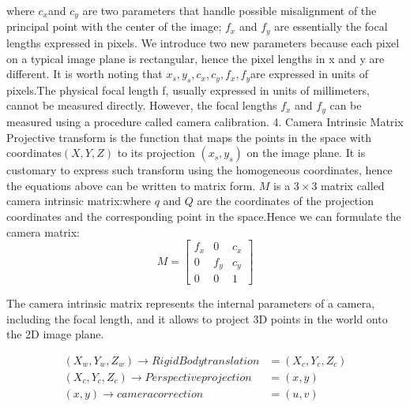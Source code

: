 \documentclass{article}
\begin{document}
where $c_x$and $c_y$
are two parameters that handle possible misalignment of the principal point with the center of the image; $f_x$ and $f_y$
are essentially the focal lengths expressed in pixels. We introduce two new parameters because each pixel on a typical image plane is rectangular, hence the pixel lengths in x and y are different. It is worth noting that $x_s,y_s,c_x,c_y,f_x,f_y$are expressed in units of pixels.The physical focal length f, usually expressed in units of millimeters, cannot be measured directly. However, the focal lengths $f_x$ and $f_y$ can be measured using a procedure called camera calibration.
4. Camera Intrinsic Matrix
Projective transform is the function that maps the points in the space with coordinates$(X, Y, Z)$ to its projection $(x_s, y_s)$ on the image plane. It is customary to express such transform using the homogeneous coordinates, hence the equations above can be written to matrix form.
$M$ is a $3\times3$ matrix called camera intrinsic matrix:where $q$ and $Q$ are the coordinates of the projection coordinates  and the corresponding point in the space.Hence we can formulate the camera matrix:
\begin{equation}
    M = \begin{bmatrix}
        f_x&0&c_x \\
        0&f_y&c_y \\
        0&0&1
    \end{bmatrix}
\end{equation}

The camera intrinsic matrix represents the internal parameters of a camera, including the focal length, and it allows to project 3D points in the world onto the 2D image plane.


\begin{align*}
    (X_w,Y_w,Z_w)\rightarrow Rigid Body translation &= (X_c,Y_c,Z_c)
    \\(X_c,Y_c,Z_c)\rightarrow Perspective projection &= (x,y)\\(x,y)\rightarrow camera correction &= (u,v)
\end{align*}
\end{document}

